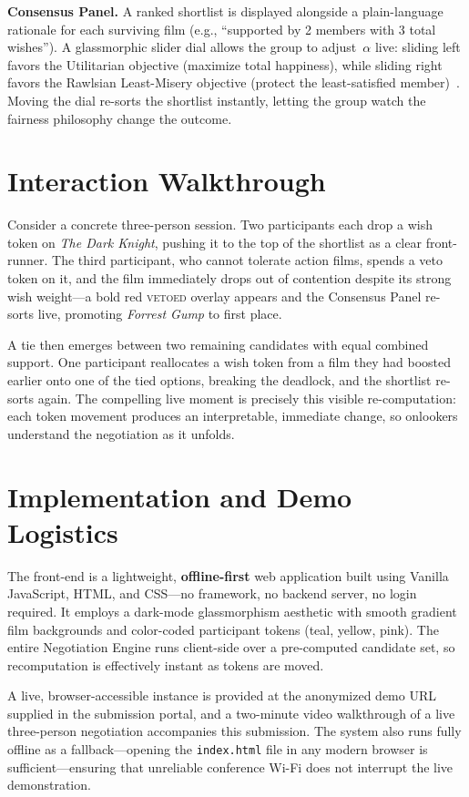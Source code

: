 \documentclass[sigconf]{acmart}
\begin{document}
\textbf{Consensus Panel.}
A ranked shortlist is displayed alongside a plain-language rationale for each surviving film (e.g., ``supported by 2 members with 3 total wishes''). A glassmorphic slider dial allows the group to adjust~$\alpha$ live: sliding left favors the Utilitarian objective (maximize total happiness), while sliding right favors the Rawlsian Least-Misery objective (protect the least-satisfied member)~\cite{masthoff2011group}. Moving the dial re-sorts the shortlist instantly, letting the group watch the fairness philosophy change the outcome.

\section{Interaction Walkthrough}
Consider a concrete three-person session. Two participants each drop a wish token on \emph{The Dark Knight}, pushing it to the top of the shortlist as a clear front-runner. The third participant, who cannot tolerate action films, spends a veto token on it, and the film immediately drops out of contention despite its strong wish weight---a bold red \textsc{vetoed} overlay appears and the Consensus Panel re-sorts live, promoting \emph{Forrest Gump} to first place.

A tie then emerges between two remaining candidates with equal combined support. One participant reallocates a wish token from a film they had boosted earlier onto one of the tied options, breaking the deadlock, and the shortlist re-sorts again. The compelling live moment is precisely this visible re-computation: each token movement produces an interpretable, immediate change, so onlookers understand the negotiation as it unfolds.

\section{Implementation and Demo Logistics}
The front-end is a lightweight, \textbf{offline-first} web application built using Vanilla JavaScript, HTML, and CSS---no framework, no backend server, no login required. It employs a dark-mode glassmorphism aesthetic with smooth gradient film backgrounds and color-coded participant tokens (teal, yellow, pink). The entire Negotiation Engine runs client-side over a pre-computed candidate set, so recomputation is effectively instant as tokens are moved.

A live, browser-accessible instance is provided at the anonymized demo URL supplied in the submission portal, and a two-minute video walkthrough of a live three-person negotiation accompanies this submission. The system also runs fully offline as a fallback---opening the \texttt{index.html} file in any modern browser is sufficient---ensuring that unreliable conference Wi-Fi does not interrupt the live demonstration.
\end{document}
